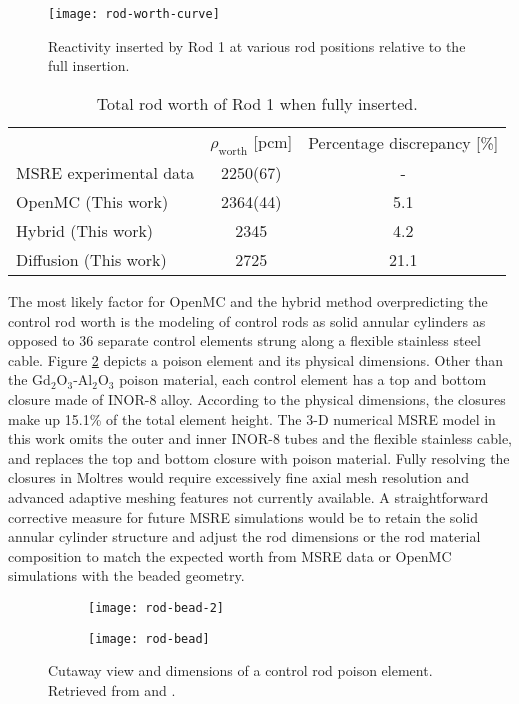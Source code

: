 \begin{figure}[t]
  \centering
  \texttt{[image: rod-worth-curve]}
  \caption{Reactivity inserted by Rod 1 at various rod positions relative to the full insertion.}
  \label{fig:rod-worth}
\end{figure}

\begin{table}[t]
  \centering
  \caption{Total rod worth of Rod 1 when fully inserted.}
  \begin{tabular}{l S[table-format=4(2)] S}
    \toprule
     & {$\rho_\text{worth}$ [pcm]} & {Percentage discrepancy [\%]}\\
     \cmidrule(rl){2-2} \cmidrule(l){3-3}
    \gls{MSRE} experimental data & 2250(67) & {-}\\
    OpenMC (This work) & 2364(44) & 5.1 \\
    Hybrid (This work) & 2345 & 4.2 \\
    Diffusion (This work) & 2725 & 21.1 \\
    \bottomrule
  \end{tabular}
  \label{table:rod-worth}
\end{table}

The most likely factor for OpenMC and the hybrid method overpredicting the control rod worth is the
modeling of control rods as solid annular cylinders as opposed to 36 separate control elements
strung along a flexible stainless steel cable. Figure \ref{fig:rod-bead} depicts a poison element
and its physical dimensions. Other than the Gd$_2$O$_3$-Al$_2$O$_3$ poison material, each control
element has a top and bottom closure made of INOR-8 alloy. According to the physical dimensions,
the closures make up 15.1\% of the total element height. The 3-D numerical \gls{MSRE} model in this
work omits the outer and inner INOR-8 tubes and the flexible stainless cable, and replaces the top
and bottom closure with poison material. Fully resolving the closures in Moltres would require
excessively fine axial mesh resolution and advanced adaptive meshing features not currently
available. A straightforward corrective measure for future \gls{MSRE} simulations would be to
retain the solid annular cylinder structure and adjust the rod dimensions or the rod material
composition to match the expected worth from \gls{MSRE} data or OpenMC simulations with the beaded
geometry.

\begin{figure}[t]
  \begin{subfigure}[b]{0.33\columnwidth}
    \centering
    \texttt{[image: rod-bead-2]}
  \end{subfigure}
  \begin{subfigure}[b]{0.65\columnwidth}
    \centering
    \texttt{[image: rod-bead]}
  \end{subfigure}
  \caption{Cutaway view and dimensions of a control rod poison element. Retrieved from
  \cite{tolson_msre_1967} and \cite{robertson_msre_1965}.}
  \label{fig:rod-bead}
\end{figure}

